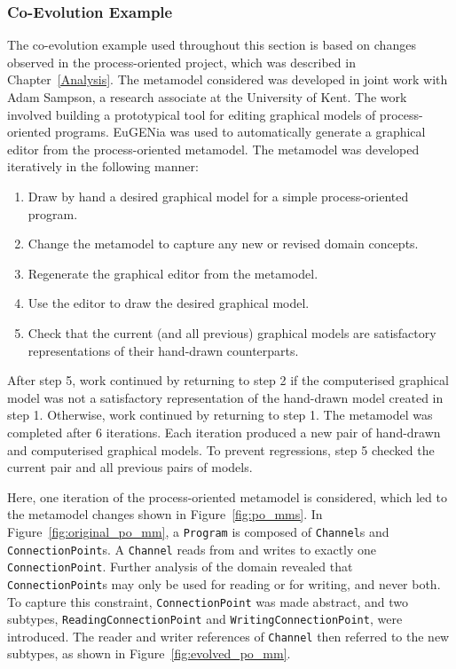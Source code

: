 \subsubsection{Co-Evolution Example}
The co-evolution example used throughout this section is based on changes observed in the process-oriented project, which was described in Chapter~\ref{Analysis}. The metamodel considered was developed in joint work with Adam Sampson, a research associate at the University of Kent. The work involved building a prototypical tool for editing graphical models of process-oriented programs. EuGENia \cite{kolovos09eugenia} was used to automatically generate a graphical editor from the process-oriented metamodel. The metamodel was developed iteratively in the following manner:

\begin{enumerate}
	\item Draw by hand a desired graphical model for a simple process-oriented program.
	\item Change the metamodel to capture any new or revised domain concepts.
	\item Regenerate the graphical editor from the metamodel.
	\item Use the editor to draw the desired graphical model.
	\item Check that the current (and all previous) graphical models are satisfactory representations of their hand-drawn counterparts.
\end{enumerate}

After step 5, work continued by returning to step 2 if the computerised graphical model was not a satisfactory representation of the hand-drawn model created in step 1. Otherwise, work continued by returning to step 1. The metamodel was completed after 6 iterations. Each iteration produced a new pair of hand-drawn and computerised graphical models. To prevent regressions, step 5 checked the current pair and all previous pairs of models.

Here, one iteration of the process-oriented metamodel is considered, which led to the metamodel changes shown in Figure~\ref{fig:po_mms}. In Figure~\ref{fig:original_po_mm}, a \texttt{Pr\-og\-r\-am} is composed of \texttt{Channel}s and \texttt{Co\-nn\-ec\-ti\-onPo\-in\-t}s. A \texttt{Ch\-an\-n\-el} reads from and writes to exactly one \texttt{Co\-nn\-ec\-ti\-o\-nPo\-i\-nt}. Further analysis of the domain revealed that \texttt{Co\-nn\-ec\-ti\-o\-nPo\-i\-nt}s may only be used for reading or for writing, and never both. To capture this constraint, \texttt{Co\-nn\-ec\-ti\-o\-nPo\-i\-nt} was made abstract, and two subtypes, \texttt{Re\-ad\-i\-ngCo\-nn\-ec\-ti\-o\-nPo\-i\-nt} and \texttt{Wr\-i\-ti\-ngCo\-nn\-ec\-ti\-o\-nPo\-i\-nt}, were introduced. The reader and writer references of \texttt{Ch\-an\-n\-el} then referred to the new subtypes, as shown in Figure~\ref{fig:evolved_po_mm}.

